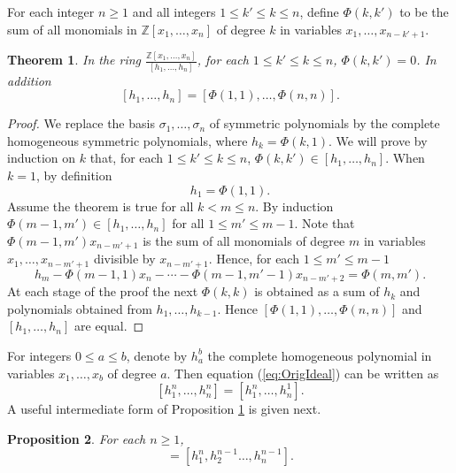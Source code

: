 \documentclass{article}
\theoremstyle{plain}
\newtheorem{thm}{Theorem}[section]
\newtheorem{prop}[thm]{Proposition}
\theoremstyle{definition}
\numberwithin{thm}{section}
\begin{document}
			For each integer $n\geq 1$ and all integers $1 \leq k' \leq k \leq n$,
			define $\Phi(k,k')$ to be the sum of all monomials in $\mathbb{Z}[x_1,\dots,x_n]$ of degree $k$ in variables $x_1,\dots,x_{n-k'+1}$.
			
			\begin{thm}\label{thm:monomial sum}
				In the ring $\frac{\mathbb{Z}[x_1,\dots,x_n]}{[h_1,\dots,h_n]}$,
				for each $1 \leq k' \leq k \leq n$, $\Phi(k,k')=0$.
				In addition 
				\begin{equation}\label{eq:OrigIdeal}
					[h_1,\dots,h_n]=[\Phi(1,1),\dots,\Phi(n,n)].
				\end{equation}
			\end{thm}
			\begin{proof}
				We replace the basis $\sigma_1,\dots,\sigma_n$ of symmetric polynomials by the complete homogeneous symmetric polynomials,
				where $h_k=\Phi(k,1)$.
				We will prove by induction on $k$ that, for each $1 \leq k' \leq k \leq n$, $\Phi(k,k')\in [h_1,\dots,h_n]$.
				When $k=1$, by definition
				\begin{equation*}
						h_1=\Phi(1,1).
				\end{equation*}
				Assume the theorem is true for all $k<m\leq n$.
				By induction $\Phi(m-1,m')\in [h_1,\dots,h_n]$ for all $1 \leq m'\leq m-1$.
				Note that $\Phi(m-1,m')x_{n-m'+1}$ is the sum of all monomials of degree $m$  in variables $x_1,\dots,x_{n-m'+1}$ divisible by $x_{n-m'+1}$.
				Hence, for each $1\leq m'\leq m-1$
				\begin{equation*}
						h_m-\Phi(m-1,1)x_n-\cdots-\Phi(m-1,m'-1)x_{n-m'+2}=\Phi(m,m').
				\end{equation*}
				At each stage of the proof the next $\Phi(k,k)$ is obtained as a sum of $h_k$ and polynomials obtained from $h_1,\dots,h_{k-1}$.
				Hence $[\Phi(1,1),\dots,\Phi(n,n)]$ and $[h_1,\dots,h_n]$ are equal.
			\end{proof}
			
			For integers $0\leq a\leq b$, denote by $h_a^b$ the complete homogeneous polynomial in variables $x_1,\dots,x_b$ of degree $a$.
			Then equation (\ref{eq:OrigIdeal}) can be written as
			\begin{equation}\label{eq:SipleRedusingHomogenious}
				[h_1^n,\dots,h_n^n]=[h_1^n,\dots,h_n^1].
			\end{equation}
			A useful intermediate form of Proposition \ref{thm:monomial sum} is given next.
			
			\begin{prop}\label{prop:Homogeneous-1}
				For each $n\geq 1$,
				\begin{equation*}
					[h_1^n,\dots,h_n^n]=[h_1^n,h_2^{n-1}\dots,h_n^{n-1}].
				\end{equation*}
			\end{prop}
			
\end{document}
